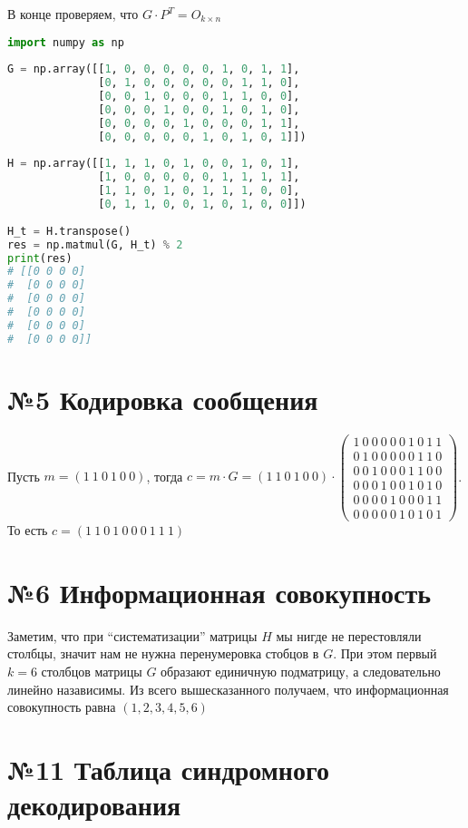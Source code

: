 \documentclass[fontsize=14pt]{article}
\begin{document}
	В конце проверяем, что $G \cdot P^T = O_{k \times n}$
	
\begin{lstlisting}[frame=single, language=Python]
import numpy as np
 
G = np.array([[1, 0, 0, 0, 0, 0, 1, 0, 1, 1],
              [0, 1, 0, 0, 0, 0, 0, 1, 1, 0],
              [0, 0, 1, 0, 0, 0, 1, 1, 0, 0],
              [0, 0, 0, 1, 0, 0, 1, 0, 1, 0],
              [0, 0, 0, 0, 1, 0, 0, 0, 1, 1],
              [0, 0, 0, 0, 0, 1, 0, 1, 0, 1]])
 
H = np.array([[1, 1, 1, 0, 1, 0, 0, 1, 0, 1],
              [1, 0, 0, 0, 0, 0, 1, 1, 1, 1],
              [1, 1, 0, 1, 0, 1, 1, 1, 0, 0],
              [0, 1, 1, 0, 0, 1, 0, 1, 0, 0]])
 
H_t = H.transpose()
res = np.matmul(G, H_t) % 2
print(res)
# [[0 0 0 0]
#  [0 0 0 0]
#  [0 0 0 0]
#  [0 0 0 0]
#  [0 0 0 0]
#  [0 0 0 0]]	
\end{lstlisting}

\section*{№5 Кодировка сообщения}

Пусть $m = (1\ 1\ 0\ 1\ 0\ 0)$, тогда $c = m \cdot G = (1\ 1\ 0\ 1\ 0\ 0) \cdot
\begin{pmatrix}
		1\ 0\ 0\ 0\ 0\ 0\ 1\ 0\ 1\ 1\\
		0\ 1\ 0\ 0\ 0\ 0\ 0\ 1\ 1\ 0\\
		0\ 0\ 1\ 0\ 0\ 0\ 1\ 1\ 0\ 0\\
		0\ 0\ 0\ 1\ 0\ 0\ 1\ 0\ 1\ 0\\
		0\ 0\ 0\ 0\ 1\ 0\ 0\ 0\ 1\ 1\\
		0\ 0\ 0\ 0\ 0\ 1\ 0\ 1\ 0\ 1	
	\end{pmatrix}$.
То есть $c = (1\ 1\ 0\ 1\ 0\ 0\ 0\ 1\ 1\ 1)$
	
\section*{№6 Информационная совокупность}

Заметим, что при \enquote{систематизации} матрицы $H$ мы нигде не перестовляли столбцы, значит нам не нужна перенумеровка стобцов в $G$. При этом первый $k = 6$ столбцов матрицы $G$ образают единичную подматрицу, а следовательно линейно назависимы. Из всего вышесказанного получаем, что информационная совокупность равна $(1, 2, 3, 4, 5, 6)$  	

\section*{№11 Таблица синдромного декодирования}
\end{document}
